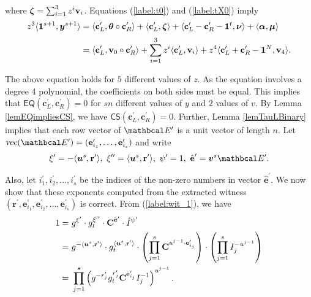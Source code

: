 where ${\boldsymbol{\zeta}} = \sum_{i=1}^{3} z^{i} \textbf{v}_i$. Equations (\ref{label:t0}) and (\ref{label:tX0}) imply
\begin{align*}
    z^3 \langle {\boldsymbol{1}}^{s+1}, {\boldsymbol{y}}^{s+1} \rangle
    &= \langle \textbf{c}_L^{\prime}, {\boldsymbol{\theta}} \circ \textbf{c}_R^{\prime} \rangle + 
    \langle \textbf{c}_L^{\prime}, {\boldsymbol{\zeta}} \rangle
    +
    \langle \textbf{c}_L^{\prime}-\textbf{c}_R^{\prime} - {\boldsymbol{1}}^{t}, {\boldsymbol{\nu}} \rangle
    +
    \langle {\boldsymbol{\alpha}}, {\boldsymbol{\mu}} \rangle
    \\[2pt]
    &= 
    \langle \textbf{c}_L^{\prime}, \textbf{v}_0 \circ \textbf{c}_R^{\prime} \rangle + 
    \sum_{i=1}^{3} z^i \langle \textbf{c}_L^{\prime}, \textbf{v}_i \rangle +
    z^4 \langle \textbf{c}_L^{\prime}+\textbf{c}_R^{\prime} - {\boldsymbol{1}}^{N}, \textbf{v}_4 \rangle.
\end{align*}

The above equation holds for $5$ different values of $z$. 
As the equation involves a degree 4 polynomial, the coefficients on both sides must be equal. 
This implies that $\textsf{EQ}(\textbf{c}_L^{\prime}, \textbf{c}_R^{\prime})=0$ for $sn$ different values of $y$ and $2$ values of $v$. 
By Lemma \ref{lemEQimpliesCS}, we have $\textsf{CS}(\textbf{c}_L^{\prime}, \textbf{c}_R^{\prime})=0$. 
Further, Lemma \ref{lemTauLBinary} implies that each row vector of $\Emat^{\prime}$ is a unit vector of length $n$.
Let $\textsl{vec}(\Emat^{\prime}) = (\textbf{e}_{i_1}^{\prime}, \dots, \textbf{e}_{i_s}^{\prime})$ and write
\begin{equation*}
    \xi^{\prime} = -\langle \vecnb{u}^s, \textbf{r}^{\prime} \rangle, \ \xi^{\prime \prime} = \langle \vecnb{u}^s, \textbf{r}^{\prime}\rangle, \
    \psi^{\prime} = 1, \
    \hat{\textbf{e}}^{\prime} = \vecnb{v}^{s}\Emat^{\prime}.
\end{equation*}

Also, let $i_1^{\prime}, i_2^{\prime}, \dots, i_s^{\prime}$ be the indices of the non-zero numbers in vector
$\hat{\textbf{e}}^{\prime}$. We now show that these exponents computed from the extracted witness
$(\textbf{r}^{\prime}, \textbf{e}_{i_1}^{\prime}, \textbf{e}_{i_2}^{\prime}, \dots, \textbf{e}_{i_s}^{\prime} )$ is correct.
From (\ref{label:wit_1}), we have
\begin{align*}
    1 =& \ g^{\xi^{\prime}} \cdot g_t^{\xi^{\prime \prime}} \cdot \textbf{C}^{\hat{\textbf{e}}^{\prime}} \cdot \hat{I}^{\psi^{\prime}}\\
    =& \ g^{-\langle {\boldsymbol{u}}^s, \textbf{r}^{\prime} \rangle}\cdot
    g_t^{\langle {\boldsymbol{u}}^s, \textbf{r}^{\prime}\rangle}\cdot
    \left(\prod_{j=1}^{s} \textbf{C}^{u^{j - 1} \cdot \textbf{e}_{i_j}^{\prime}}\right) \cdot 
    \left(\prod_{j=1}^{s} I_j^{-u^{j-1}}\right)\\
    =& \ \prod_{j=1}^{s} \left( g^{-r_j^{\prime}} g_t^{r_j^{\prime}} \textbf{C}^{\textbf{e}_{i_j}^{\prime}} I_j^{-1}\right)^{u^{j - 1}}.
\end{align*}

